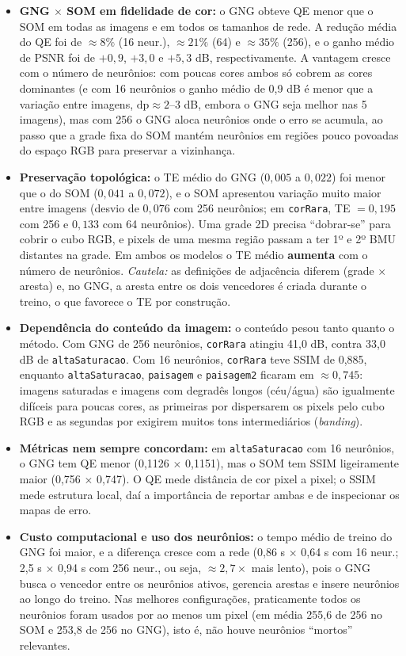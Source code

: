 \documentclass[11pt,a4paper]{article}
\begin{document}
\begin{itemize}
    \item \textbf{GNG $\times$ SOM em fidelidade de cor:} o GNG obteve QE menor que o SOM em todas as imagens e em todos os tamanhos de rede. A redução média do QE foi de $\approx 8\%$ (16 neur.), $\approx 21\%$ (64) e $\approx 35\%$ (256), e o ganho médio de PSNR foi de $+0{,}9$, $+3{,}0$ e $+5{,}3$ dB, respectivamente. A vantagem cresce com o número de neurônios: com poucas cores ambos só cobrem as cores dominantes (e com 16 neurônios o ganho médio de 0,9 dB é menor que a variação entre imagens, $\text{dp}\approx 2$--$3$ dB, embora o GNG seja melhor nas 5 imagens), mas com 256 o GNG aloca neurônios onde o erro se acumula, ao passo que a grade fixa do SOM mantém neurônios em regiões pouco povoadas do espaço RGB para preservar a vizinhança.
    \item \textbf{Preservação topológica:} o TE médio do GNG ($0{,}005$ a $0{,}022$) foi menor que o do SOM ($0{,}041$ a $0{,}072$), e o SOM apresentou variação muito maior entre imagens (desvio de $0{,}076$ com 256 neurônios; em \texttt{corRara}, TE $=0{,}195$ com 256 e $0{,}133$ com 64 neurônios). Uma grade 2D precisa ``dobrar-se'' para cobrir o cubo RGB, e pixels de uma mesma região passam a ter 1º e 2º BMU distantes na grade. Em ambos os modelos o TE médio \textbf{aumenta} com o número de neurônios. \textit{Cautela:} as definições de adjacência diferem (grade $\times$ aresta) e, no GNG, a aresta entre os dois vencedores é criada durante o treino, o que favorece o TE por construção.
    \item \textbf{Dependência do conteúdo da imagem:} o conteúdo pesou tanto quanto o método. Com GNG de 256 neurônios, \texttt{corRara} atingiu 41,0 dB, contra 33,0 dB de \texttt{altaSaturacao}. Com 16 neurônios, \texttt{corRara} teve SSIM de 0,885, enquanto \texttt{altaSaturacao}, \texttt{paisagem} e \texttt{paisagem2} ficaram em $\approx 0{,}745$: imagens saturadas e imagens com degradês longos (céu/água) são igualmente difíceis para poucas cores, as primeiras por dispersarem os pixels pelo cubo RGB e as segundas por exigirem muitos tons intermediários (\textit{banding}).
    \item \textbf{Métricas nem sempre concordam:} em \texttt{altaSaturacao} com 16 neurônios, o GNG tem QE menor (0,1126 $\times$ 0,1151), mas o SOM tem SSIM ligeiramente maior (0,756 $\times$ 0,747). O QE mede distância de cor pixel a pixel; o SSIM mede estrutura local, daí a importância de reportar ambas e de inspecionar os mapas de erro.
    \item \textbf{Custo computacional e uso dos neurônios:} o tempo médio de treino do GNG foi maior, e a diferença cresce com a rede (0,86 s $\times$ 0,64 s com 16 neur.; 2,5 s $\times$ 0,94 s com 256 neur., ou seja, $\approx 2{,}7\times$ mais lento), pois o GNG busca o vencedor entre os neurônios ativos, gerencia arestas e insere neurônios ao longo do treino. Nas melhores configurações, praticamente todos os neurônios foram usados por ao menos um pixel (em média 255,6 de 256 no SOM e 253,8 de 256 no GNG), isto é, não houve neurônios ``mortos'' relevantes.

\end{itemize}
\end{document}
